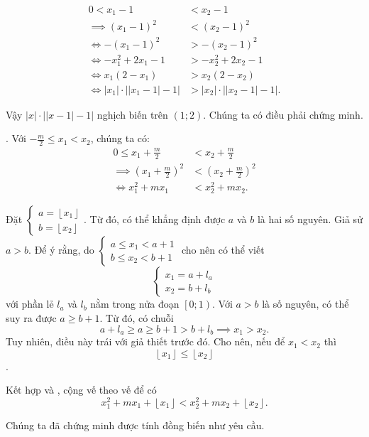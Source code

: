 \begin{align*}
   0 < x_1 - 1 &< x_2 - 1 \\
   \implies  \left(x_1 - 1\right)^2 &< \left(x_2 - 1\right)^2 \\
   \iff -\left(x_1 - 1\right)^2 &> -\left(x_2 - 1\right)^2 \\
   \iff -x_1^2 + 2x_1 - 1 &> -x_2^2 + 2x_2 - 1 \\
   \iff x_1 \left(2 - x_1\right) &> x_2\left(2-x_2\right) \\
   \iff |x_1|\cdot \left|\left|x_1 - 1\right| - 1\right| &> |x_2|\cdot \left|\left|x_2 - 1\right| - 1\right|.
\end{align*}

Vậy $|x|\cdot \left|\left|x - 1\right| - 1\right|$ nghịch biến trên $(1; 2)$. Chúng ta có điều phải chứng minh.

. Với $-\frac{m}{2} \leq x_1 < x_2$, chúng ta có:
\begin{align}
   0 \leq x_1 + \frac{m}{2} &< x_2 + \frac{m}{2} \nonumber\\
   \implies \left(x_1 + \frac{m}{2}\right)^2 &< \left(x_2 + \frac{m}{2}\right)^2 \nonumber\\
   \iff x_1^2 + mx_1 &< x_2^2 + mx_2. \label{eq:toan_hoc_nen_tang:tinh_chat_ham:tang_giam:1.4.1}
\end{align}

Đặt $\begin{cases}
   a = \left\lfloor x_1 \right\rfloor \\
   b = \left\lfloor x_2 \right\rfloor
\end{cases}$. Từ đó, có thể khẳng định được $a$ và $b$ là hai số nguyên. Giả sử $a > b$. Để ý rằng, do $\begin{cases}
   a\leq x_1 < a + 1 \\
   b \leq x_2 < b + 1
\end{cases}$ cho nên có thể viết $$\begin{cases}
   x_1 = a + l_a \\
   x_2 = b + l_b
\end{cases}$$ với phần lẻ $l_a$ và $l_b$ nằm trong nửa đoạn $\left[0; 1\right)$. Với $a > b$ là số nguyên, có thể suy ra được $a \geq b + 1$. Từ đó, có chuỗi $$a + l_a \geq a \geq b + 1 > b + l_b \implies x_1 > x_2.$$ Tuy nhiên, điều này trái với giả thiết trước đó. Cho nên, nếu để $x_1 < x_2$ thì \begin{equation}
   \left\lfloor x_1 \right\rfloor\leq \left\lfloor x_2 \right\rfloor \label{eq:toan_hoc_nen_tang:tinh_chat_ham:tang_giam:1.4.2}
\end{equation}.

Kết hợp  và , cộng vế theo vế để có $$x_1^2 + mx_1 + \left\lfloor x_1 \right\rfloor < x_2^2 + mx_2 + \left\lfloor x_2 \right\rfloor.$$

Chúng ta đã chứng minh được tính đồng biến như yêu cầu.